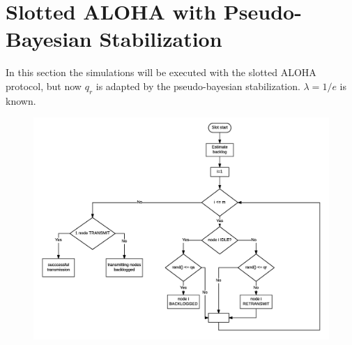 \documentclass{article}
\begin{document}
\newpage

\section{Slotted ALOHA with Pseudo-Bayesian Stabilization}

In this section the simulations will be executed with the slotted ALOHA protocol, but now $q_r$ is adapted by the pseudo-bayesian stabilization. $\lambda=1/e$ is known.
\begin{figure}[h]
  \includegraphics[width=.9\textwidth]{figures/flowchart-stabilized.png}
\end{figure}
\end{document}
